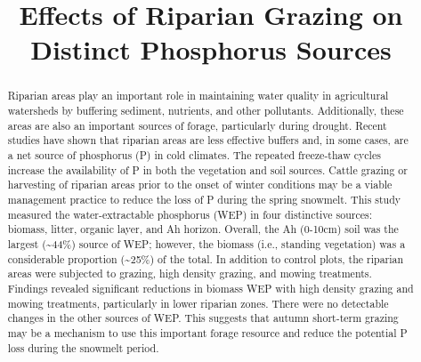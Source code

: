 \documentclass[
]{agujournal2019}
\begin{document}
\title{Effects of Riparian Grazing on Distinct Phosphorus Sources}



\begin{abstract}
Riparian areas play an important role in maintaining water quality in
agricultural watersheds by buffering sediment, nutrients, and other
pollutants. Additionally, these areas are also an important sources of
forage, particularly during drought. Recent studies have shown that
riparian areas are less effective buffers and, in some cases, are a net
source of phosphorus (P) in cold climates. The repeated freeze-thaw
cycles increase the availability of P in both the vegetation and soil
sources. Cattle grazing or harvesting of riparian areas prior to the
onset of winter conditions may be a viable management practice to reduce
the loss of P during the spring snowmelt. This study measured the
water-extractable phosphorus (WEP) in four distinctive sources: biomass,
litter, organic layer, and Ah horizon. Overall, the Ah (0-10cm) soil was
the largest (\textasciitilde44\%) source of WEP; however, the biomass
(i.e., standing vegetation) was a considerable proportion
(\textasciitilde25\%) of the total. In addition to control plots, the
riparian areas were subjected to grazing, high density grazing, and
mowing treatments. Findings revealed significant reductions in biomass
WEP with high density grazing and mowing treatments, particularly in
lower riparian zones. There were no detectable changes in the other
sources of WEP. This suggests that autumn short-term grazing may be a
mechanism to use this important forage resource and reduce the potential
P loss during the snowmelt period.
\end{abstract}
\end{document}
